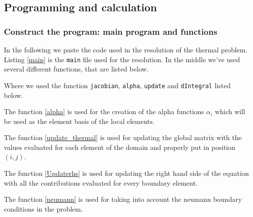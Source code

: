 \subsection{Programming and calculation}
\subsubsection{Construct the program: main program and functions}
In the following we paste the code used in the resolution of the thermal problem. 
Listing \ref{main} is the \texttt{main} file used for the resolution. In the middle we've used several different functions, that are listed below.



Where we used the function \texttt{jacobian}, \texttt{alpha}, \texttt{update} and \texttt{dIntegral} listed below.




The function \ref{alpha} is used for the creation of the alpha functions $ \alpha_i $ which will be used as the element basis of the local elements.


The function \ref{update_thermal} is used for updating the global matrix with the values evaluated for each element of the domain and properly put in position $ (i,j) $.




The function \ref{Updaterhs} is used for updating the right hand side of the equation with all the contributions evaluated for every boundary element.
\medskip







The function \ref{neumann} is used for taking into account the neumann boundary conditions in the problem.



